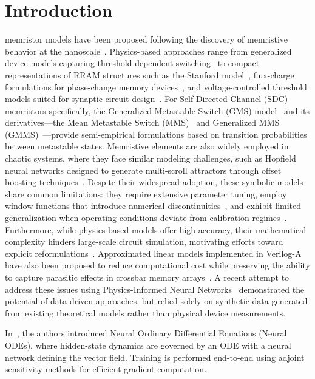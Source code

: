 \documentclass[a4,journal]{IEEEtran}
\begin{document}
\section{Introduction}
 memristor models have been proposed following the discovery of memristive behavior at the nanoscale~\cite{Strukov2008}. Physics-based approaches range from generalized device models capturing threshold-dependent switching~\cite{Yakopcic2011,Kvatinsky2013, Kvatinsky2015} to compact representations of RRAM structures such as the Stanford model~\cite{guan2012spice, di2022oscillatory}, flux-charge formulations for phase-change memory devices~\cite{Secco2018}, and voltage-controlled threshold models suited for synaptic circuit design~\cite{Zhang2017}.  For Self-Directed Channel (SDC) memristors specifically, the Generalized Metastable Switch (GMS) model~\cite{Molter2016} and its derivatives---the Mean Metastable Switch (MMS)~\cite{Minati2020} and Generalized MMS (GMMS)~\cite{Ostrovskii2021}---provide semi-empirical formulations based on transition probabilities between metastable states. Memristive elements are also widely employed in chaotic systems, where they face similar modeling challenges, such as Hopfield neural networks designed to generate multi-scroll attractors through offset boosting techniques~\cite{Li2025}. Despite their widespread adoption, these symbolic models share common limitations: they require extensive parameter tuning, employ window functions that introduce numerical discontinuities~\cite{CorintoBoundaryConditionModelingMemristor,Galias2019,Slipko2021}, and exhibit limited generalization when operating conditions deviate from calibration regimes~\cite{Linn2014, Galias2018}. Furthermore, while physics-based models  offer high accuracy, their mathematical complexity hinders large-scale circuit simulation, motivating efforts toward explicit reformulations~\cite{Ntinas2022}. Approximated linear models implemented in Verilog-A have also been proposed to reduce computational cost while preserving the ability to capture parasitic effects in crossbar memory arrays~\cite{Lupo2019}. A recent attempt to address these issues using Physics-Informed Neural Networks~\cite{Lee2024} demonstrated the potential of data-driven approaches, but relied solely on synthetic data generated from existing theoretical models rather than physical device measurements.

In~\cite{Ricky2018}, the authors introduced Neural Ordinary Differential Equations (Neural ODEs), where hidden-state dynamics are governed by an ODE with a neural network defining the vector field. Training is performed end-to-end using adjoint sensitivity methods for efficient gradient computation.
\end{document}

